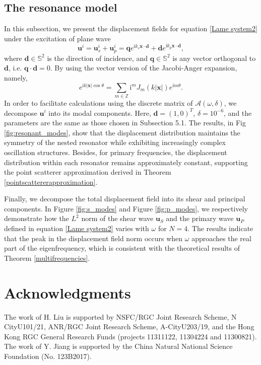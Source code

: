 \documentclass[10pt,reqno,oneside]{amsart}%
\theoremstyle{definition}
\theoremstyle{remark}
\numberwithin{equation}{section}
\numberwithin{equation}{section}
\begin{document}
\subsection{The resonance model}
In this subsection, we present the displacement fields for equation \eqref{Lame system2} under the excitation of plane wave
\begin{equation}\label{incident wave}
	\mathbf{u}^i=\mathbf{u}^i_{s}+\mathbf{u}^i_{p}=\mathbf{q}e^{\mathrm{i}k_s\mathbf{x}\cdot \mathbf{d}}+\mathbf{d}e^{\mathrm{i}k_p\mathbf{x}\cdot \mathbf{d}},
\end{equation}
where $\mathbf{d}\in \mathbb{S}^2$ is the direction of incidence, and $\mathbf{q}\in \mathbb{S}^2$ is any vector orthogonal to $\mathbf{d}$, i.e. $\mathbf{q}\cdot \mathbf{d}=0$.
By using the vector version of the Jacobi-Anger expansion\cite{ColtonKress}, namely,
\begin{equation}
	e^{\mathrm{i}k|\mathbf{x}|\cos\theta}=\sum_{m\in \mathbb{Z}}\mathrm{i}^mJ_m(k|\mathbf{x}|)e^{\mathrm{i}m\theta}.
\end{equation}
In order to facilitate calculations using the discrete matrix of $\mathcal{A}(\omega,\delta)$, we decompose $\mathbf{u}^i$ into its modal components. Here, $\mathbf{d}=(1,0)^{T}$, $\delta=10^{-6}$, and the parameters are the same as those chosen in Subsection 5.1. The results, in Fig \ref{fig:resonant_modes}, show that the displacement distribution maintains the symmetry of the nested resonator while exhibiting increasingly complex oscillation structures. Besides, for primary frequencies, the displacement distribution within each resonator remains approximately constant, supporting the point scatterer approximation derived in Theorem \ref{pointscattererapproximation}.

Finally, we decompose the total displacement field into its shear and principal components. In Figure \ref{fig:s_modes} and Figure \ref{fig:p_modes}, we respectively demonstrate how the $L^2$ norm of the shear wave $\mathbf{u}_{S}$ and the primary wave $\mathbf{u}_{P}$ defined in equation \eqref{Lame system2} varies with $\omega$ for $N=4$. The results indicate that the peak in the displacement field norm occurs when $\omega$ approaches the real part of the eigenfrequency, which is consistent with the theoretical results of Theorem \ref{multifrequencies}.


\section*{Acknowledgments}
The work of H. Liu is supported by NSFC/RGC Joint Research Scheme, N CityU101/21, ANR/RGC Joint Research Scheme, A-CityU203/19, and the Hong Kong RGC General Research Funds (projects 11311122, 11304224 and 11300821). The work of Y. Jiang is supported by the China Natural National Science
Foundation (No. 123B2017).
\end{document}
